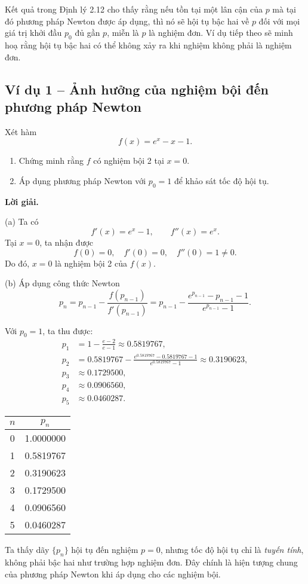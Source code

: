 Kết quả trong Định lý 2.12 cho thấy rằng 
nếu tồn tại một lân cận của $p$ mà tại đó phương pháp Newton được áp dụng, 
thì nó sẽ hội tụ bậc hai về $p$ đối với mọi giá trị khởi đầu $p_0$ đủ gần $p$, 
miễn là $p$ là nghiệm đơn.  
Ví dụ tiếp theo sẽ minh hoạ rằng hội tụ bậc hai có thể không xảy ra 
khi nghiệm không phải là nghiệm đơn.

\subsection*{Ví dụ 1 – Ảnh hưởng của nghiệm bội đến phương pháp Newton}

Xét hàm
\[
f(x) = e^x - x - 1.
\]

\begin{enumerate}[label=(\alph*)]
  \item Chứng minh rằng $f$ có nghiệm bội 2 tại $x = 0$.
  \item Áp dụng phương pháp Newton với $p_0 = 1$ để khảo sát tốc độ hội tụ.
\end{enumerate}

\textbf{Lời giải.}

(a)  
Ta có
\[
f'(x) = e^x - 1, 
\qquad 
f''(x) = e^x.
\]
Tại $x = 0$, ta nhận được
\[
f(0) = 0, 
\quad 
f'(0) = 0, 
\quad 
f''(0) = 1 \neq 0.
\]
Do đó, $x = 0$ là nghiệm bội 2 của $f(x)$.

(b)  
Áp dụng công thức Newton
\[
p_{n} = p_{n-1} - \frac{f(p_{n-1})}{f'(p_{n-1})}
       = p_{n-1} - \frac{e^{p_{n-1}} - p_{n-1} - 1}{e^{p_{n-1}} - 1}.
\]

Với $p_0 = 1$, ta thu được:
\[
\begin{aligned}
p_1 &= 1 - \frac{e - 2}{e - 1} 
      \approx 0.5819767, \\
p_2 &= 0.5819767 - 
      \frac{e^{0.5819767} - 0.5819767 - 1}{e^{0.5819767} - 1} 
      \approx 0.3190623, \\
p_3 &\approx 0.1729500, \\
p_4 &\approx 0.0906560, \\
p_5 &\approx 0.0460287.
\end{aligned}
\]

\begin{center}
\label{tab:newton-multroot}
\begin{tabular}{|c|c|}
\hline
$n$ & $p_n$ \\
\hline
0 & 1.0000000 \\
1 & 0.5819767 \\
2 & 0.3190623 \\
3 & 0.1729500 \\
4 & 0.0906560 \\
5 & 0.0460287 \\
\hline
\end{tabular}
\end{center}

Ta thấy dãy $\{p_n\}$ hội tụ đến nghiệm $p = 0$, 
nhưng tốc độ hội tụ chỉ là \textit{tuyến tính}, không phải bậc hai như trường hợp nghiệm đơn. 
Đây chính là hiện tượng chung của phương pháp Newton khi áp dụng cho các nghiệm bội.

